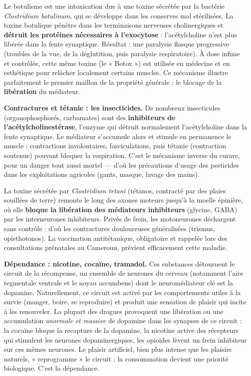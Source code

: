 \documentclass[11pt]{article}
\newcommand{\cle}[1]{{\popxbold\color{popdark}#1}}
\begin{document}
\begin{savaistu}
Le botulisme est une intoxication due à une toxine sécrétée par la bactérie \emph{Clostridium botulinum}, qui se développe dans les conserves mal stérilisées. La \cle{toxine botulique} pénètre dans les terminaisons nerveuses cholinergiques et \textbf{détruit les protéines nécessaires à l'exocytose} : l'acétylcholine n'est plus libérée dans la fente synaptique. Résultat : une paralysie flasque progressive (troubles de la vue, de la déglutition, puis paralysie respiratoire). À dose infime et contrôlée, cette même toxine (le « Botox ») est utilisée en médecine et en esthétique pour relâcher localement certains muscles. Ce mécanisme illustre parfaitement le premier maillon de la propriété générale : le blocage de la \textbf{libération} du médiateur.
\end{savaistu}

\textbf{Contractures et tétanie : les insecticides.} De nombreux insecticides (organophosphorés, carbamates) sont des \textbf{inhibiteurs de l'acétylcholinestérase}, l'enzyme qui détruit normalement l'acétylcholine dans la fente synaptique. Le médiateur s'accumule alors et stimule en permanence le muscle : contractions involontaires, fasciculations, puis tétanie (contraction soutenue) pouvant bloquer la respiration. C'est le mécanisme inverse du curare, pour un danger tout aussi mortel — d'où les précautions d'usage des pesticides dans les exploitations agricoles (gants, masque, lavage des mains).

\begin{savaistu}
La toxine sécrétée par \emph{Clostridium tetani} (tétanos, contracté par des plaies souillées de terre) remonte le long des axones moteurs jusqu'à la moelle épinière, où elle \textbf{bloque la libération des médiateurs inhibiteurs} (glycine, GABA) par les interneurones inhibiteurs. Privés de frein, les motoneurones déchargent sans contrôle : d'où les contractures douloureuses généralisées (trismus, opisthotonos). La vaccination antitétanique, obligatoire et rappelée lors des consultations prénatales au Cameroun, prévient efficacement cette maladie.
\end{savaistu}

\textbf{Dépendance : nicotine, cocaïne, tramadol.} Ces substances détournent le \cle{circuit de la récompense}, un ensemble de neurones du cerveau (notamment l'aire tegmentale ventrale et le noyau accumbens) dont le neuromédiateur clé est la \cle{dopamine}. Naturellement, ce circuit est activé par les comportements utiles à la survie (manger, boire, se reproduire) et produit une sensation de plaisir qui incite à les renouveler. La plupart des drogues provoquent une libération ou une accumulation \emph{anormale et massive} de dopamine dans les synapses de ce circuit : la cocaïne bloque la recapture de la dopamine, la nicotine active des récepteurs qui stimulent les neurones dopaminergiques, les opioïdes lèvent un frein inhibiteur sur ces mêmes neurones. Le plaisir artificiel, bien plus intense que les plaisirs naturels, « reprogramme » le circuit : la consommation devient une priorité biologique. C'est la \cle{dépendance}.
\end{document}
